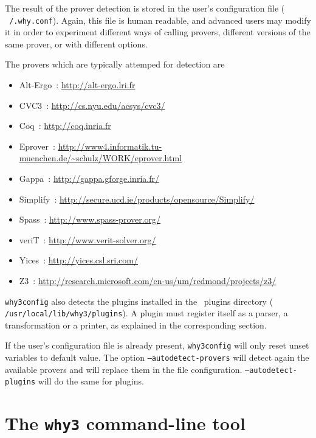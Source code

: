 The result of the prover detection is stored in the user's
configuration file (\eg{} \texttt{~/.why.conf}). Again, this file is
human readable, and advanced users may modify it in order to
experiment different ways of calling provers, \eg{} different versions
of the same prover, or with different options.

The provers which are typically attemped for detection are
\begin{itemize}
\item Alt-Ergo~\cite{conchon08smt,ergo}: \url{http://alt-ergo.lri.fr}
\item CVC3~\cite{BarTin-CAV-07}: \url{http://cs.nyu.edu/acsys/cvc3/}
\item Coq~\cite{CoqArt}: \url{http://coq.inria.fr}
\item Eprover~\cite{schulz04ijcar}: \url{http://www4.informatik.tu-muenchen.de/~schulz/WORK/eprover.html}
\item Gappa~\cite{melquiond08rnc}: \url{http://gappa.gforge.inria.fr/}
\item Simplify~\cite{simplify05}: \url{http://secure.ucd.ie/products/opensource/Simplify/}
\item Spass~: \url{http://www.spass-prover.org/}
\item veriT~: \url{http://www.verit-solver.org/}
\item Yices~\cite{DM06}: \url{http://yices.csl.sri.com/}
\item Z3~\cite{z3}: \url{http://research.microsoft.com/en-us/um/redmond/projects/z3/}
\end{itemize}

\texttt{why3config} also detects the plugins installed in the \why\
plugins directory (\eg{} \texttt{/usr/local/lib/why3/plugins}). A
plugin must register itself as a parser, a transformation or a
printer, as explained in the corresponding section.

If the user's configuration file is already present,
\texttt{why3config} will only reset unset variables to default value.
The option \texttt{--autodetect-provers} will detect again the available
provers and will replace them in the file configuration.
\texttt{--autodetect-plugins} will do the same for plugins.

\section{The \texttt{why3} command-line tool}
\label{sec:why3ref}

